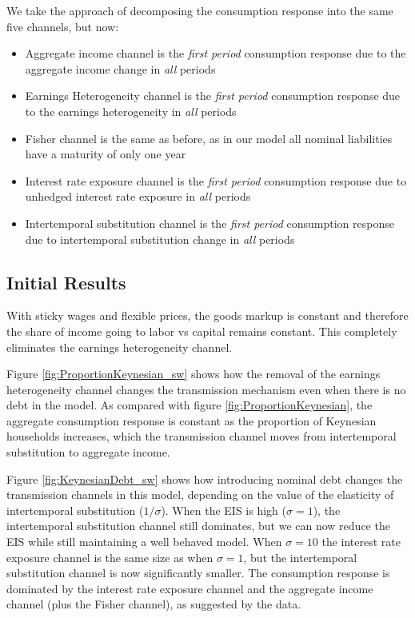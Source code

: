 \documentclass[titlepage]{\econtex}\newcommand{\texname}{ConsumptionHeterogeneity}
\begin{document}
We take the approach of decomposing the consumption response into the same five channels, but now:
\begin{itemize}
	\item Aggregate income channel is the \textit{first period} consumption response due to the aggregate income change in \textit{all} periods
	\item Earnings Heterogeneity channel is the \textit{first period} consumption response due to the earnings heterogeneity in \textit{all} periods
	\item Fisher channel is the same as before, as in our model all nominal liabilities have a maturity of only one year
	\item Interest rate exposure channel is the \textit{first period} consumption response due to unhedged interest rate exposure in \textit{all} periods
	\item Intertemporal substitution channel is the \textit{first period} consumption response due to intertemporal substitution change in \textit{all} periods
\end{itemize}

\subsection{Initial Results}
With sticky wages and flexible prices, the goods markup is constant and therefore the share of income going to labor vs capital remains constant. This completely eliminates the earnings heterogeneity channel.

Figure \ref{fig:ProportionKeynesian_sw} shows how the removal of the earnings heterogeneity channel changes the transmission mechanism even when there is no debt in the model. As compared with figure \ref{fig:ProportionKeynesian}, the aggregate consumption response is constant as the proportion of Keynesian households increases, which the transmission channel moves from intertemporal substitution to aggregate income.

Figure \ref{fig:KeynesianDebt_sw} shows how introducing nominal debt changes the transmission channels in this model, depending on the value of the elasticity of intertemporal substitution ($1/\sigma$). When the EIS is high ($\sigma=1$), the intertemporal substitution channel still dominates, but we can now reduce the EIS while still maintaining a well behaved model. When $\sigma=10$ the interest rate exposure channel is the same size as when $\sigma=1$, but the intertemporal substitution channel is now significantly smaller. The consumption response is dominated by the interest rate exposure channel and the aggregate income channel (plus the Fisher channel), as suggested by the data.
\end{document}
